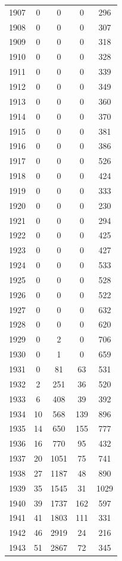 \documentclass[12pt,]{article}
\begin{document}
\begin{center}
\begin{longtable}{ccccc}
  1907 & 0 & 0 & 0 & 296 \\ 
  1908 & 0 & 0 & 0 & 307 \\ 
  1909 & 0 & 0 & 0 & 318 \\ 
  1910 & 0 & 0 & 0 & 328 \\ 
  1911 & 0 & 0 & 0 & 339 \\ 
  1912 & 0 & 0 & 0 & 349 \\ 
  1913 & 0 & 0 & 0 & 360 \\ 
  1914 & 0 & 0 & 0 & 370 \\ 
  1915 & 0 & 0 & 0 & 381 \\ 
  1916 & 0 & 0 & 0 & 386 \\ 
  1917 & 0 & 0 & 0 & 526 \\ 
  1918 & 0 & 0 & 0 & 424 \\ 
  1919 & 0 & 0 & 0 & 333 \\ 
  1920 & 0 & 0 & 0 & 230 \\ 
  1921 & 0 & 0 & 0 & 294 \\ 
  1922 & 0 & 0 & 0 & 425 \\ 
  1923 & 0 & 0 & 0 & 427 \\ 
  1924 & 0 & 0 & 0 & 533 \\ 
  1925 & 0 & 0 & 0 & 528 \\ 
  1926 & 0 & 0 & 0 & 522 \\ 
  1927 & 0 & 0 & 0 & 632 \\ 
  1928 & 0 & 0 & 0 & 620 \\ 
  1929 & 0 & 2 & 0 & 706 \\ 
  1930 & 0 & 1 & 0 & 659 \\ 
  1931 & 0 & 81 & 63 & 531 \\ 
  1932 & 2 & 251 & 36 & 520 \\ 
  1933 & 6 & 408 & 39 & 392 \\ 
  1934 & 10 & 568 & 139 & 896 \\ 
  1935 & 14 & 650 & 155 & 777 \\ 
  1936 & 16 & 770 & 95 & 432 \\ 
  1937 & 20 & 1051 & 75 & 741 \\ 
  1938 & 27 & 1187 & 48 & 890 \\ 
  1939 & 35 & 1545 & 31 & 1029 \\ 
  1940 & 39 & 1737 & 162 & 597 \\ 
  1941 & 41 & 1803 & 111 & 331 \\ 
  1942 & 46 & 2919 & 24 & 216 \\ 
  1943 & 51 & 2867 & 72 & 345 \\ 

\end{longtable}
\end{center}
\end{document}
